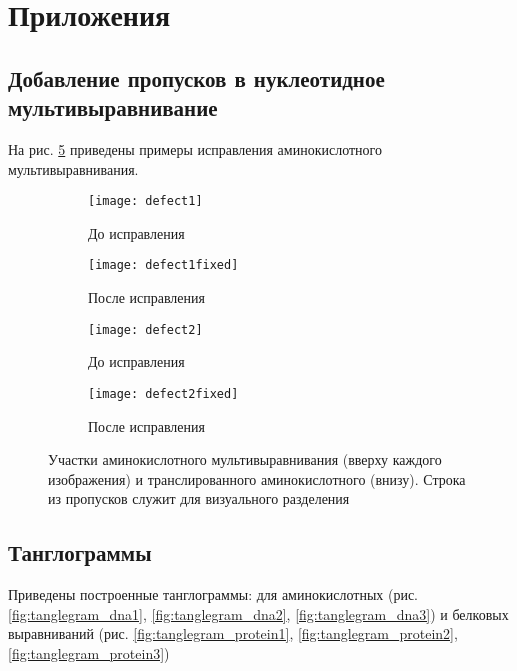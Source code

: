 \documentclass[main.tex]{subfiles}
\begin{document}
	\section{Приложения}
	\subsection{Добавление пропусков в нуклеотидное мультивыравнивание}
	На рис. \ref{fig:1} приведены примеры исправления аминокислотного мультивыравнивания.
	\begin{figure}[H]
		\centering
		\begin{subfigure}{.5\textwidth}
			\centering
			\texttt{[image: defect1]}
			\caption{До исправления}
			\label{fig:defect1}
		\end{subfigure}%
		\begin{subfigure}{.5\textwidth}
			\centering
			\texttt{[image: defect1fixed]}
			\caption{После исправления}
			\label{fig:defect1fixed}
		\end{subfigure}
	
		\begin{subfigure}{.5\textwidth}
			\centering
			\texttt{[image: defect2]}
			\caption{До исправления}
			\label{fig:defect2}
		\end{subfigure}%
		\begin{subfigure}{.5\textwidth}
			\centering
			\texttt{[image: defect2fixed]}
			\caption{После исправления}
			\label{fig:defect2fixed}
		\end{subfigure}
		\caption{Участки аминокислотного мультивыравнивания (вверху каждого изображения) и транслированного аминокислотного (внизу). Строка из пропусков служит для визуального разделения}
		\label{fig:1}
	\end{figure}

	\newpage
	\subsection{Танглограммы}
	Приведены построенные танглограммы: для аминокислотных (рис. \ref{fig:tanglegram_dna1}, \ref{fig:tanglegram_dna2}, \ref{fig:tanglegram_dna3}) и белковых выравниваний (рис. \ref{fig:tanglegram_protein1}, \ref{fig:tanglegram_protein2}, \ref{fig:tanglegram_protein3})
	
	\newcommand{\mypicture}[2]{
		\begin{figure}[H]
			\centering \texttt{[image: \#1]}
			\caption{#2}
			\label{fig:#1}
		\end{figure}
	}
\end{document}
